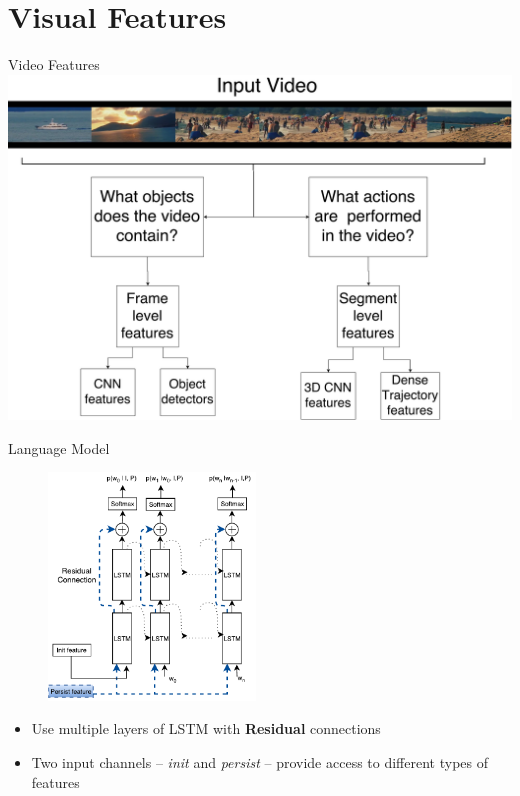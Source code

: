 \documentclass{beamer}
\begin{document}
\section{Visual Features}
\begin{frame}{Video Features}
    \centering
    \includegraphics[width=1.0\textwidth]{images/VideoFeatures.pdf}
\end{frame}
\begin{frame}{Language Model}
    \begin{figure}[h]
        \centering
        \includegraphics[width=0.49\textwidth]{images/MultilayerResidualLSTM.pdf}
    \end{figure}
    \begin{itemize}
        \item Use multiple layers of LSTM with \textbf{Residual} connections
        \item Two input channels -- \emph{init} and \emph{persist} -- provide access to different types of features
    \end{itemize}
\end{frame}
\end{document}
